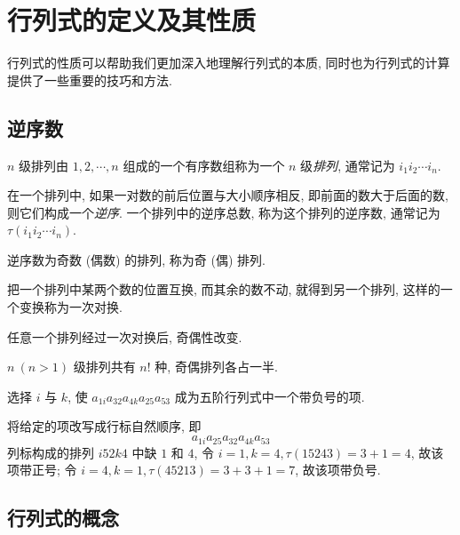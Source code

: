 \section{行列式的定义及其性质}

行列式的性质可以帮助我们更加深入地理解行列式的本质, 同时也为行列式的计算提供了一些重要的技巧和方法.

\subsection{逆序数}

\begin{definition}[排列]
    $n $ 级排列由 $ 1,2, \cdots, n $ 组成的一个有序数组称为一个 $ n $ 级\textit{排列}, 通常记为 $ i_{1} i_{2} \cdots i_{n} $.
\end{definition}
\begin{definition}[逆序数]
    在一个排列中, 如果一对数的前后位置与大小顺序相反, 即前面的数大于后面的数, 则它们构成一个\textit{逆序}.
    一个排列中的逆序总数, 称为这个排列的逆序数, 通常记为 $ \tau\left(i_{1} i_{2} \cdots i_{n}\right) $.
\end{definition}
\begin{definition}[奇 (偶) 排列]
    逆序数为奇数 (偶数) 的排列, 称为奇 (偶) 排列.
\end{definition}
\begin{definition}[对换]
    把一个排列中某两个数的位置互换, 而其余的数不动, 就得到另一个排列, 这样的一个变换称为一次对换.
\end{definition}
\begin{theorem}
    任意一个排列经过一次对换后, 奇偶性改变.
\end{theorem}
\begin{theorem}
    $ n ~(n>1)$ 级排列共有 $ n! $ 种, 奇偶排列各占一半.
\end{theorem}

\begin{example}
    选择 $i$ 与 $k$, 使 $a_{1i}a_{32}a_{4k}a_{25}a_{53}$ 成为五阶行列式中一个带负号的项.
\end{example}
\begin{solution}
    将给定的项改写成行标自然顺序, 即 $$a_{1i}a_{25}a_{32}a_{4k}a_{53}$$
    列标构成的排列 $i52k4$ 中缺 $1$ 和 $4$, 令 $i=1,k=4,\tau(15243)=3+1=4$, 故该项带正号;
    令 $i=4,k=1,\tau(45213)=3+3+1=7$, 故该项带负号.
\end{solution}

\subsection{行列式的概念}

